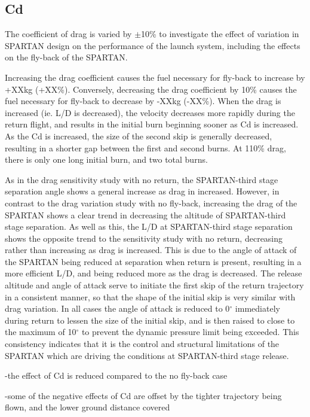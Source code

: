 \subsection{Cd}

The coefficient of drag is varied by $\pm$10\% to investigate the effect of variation in SPARTAN design on the performance of the launch system, including the effects on the fly-back of the SPARTAN. 

Increasing the drag coefficient causes the fuel necessary for fly-back to increase by +XXkg (+XX\%). Conversely, decreasing the drag coefficient by 10\% causes the fuel necessary for  fly-back to decrease by -XXkg (-XX\%). 
When the drag is increased (ie. L/D is decreased), the velocity decreases more rapidly during the return flight, and results in the initial burn beginning sooner as Cd is increased. 
As the Cd is increased, the size of the second skip is generally decreased, resulting in a shorter gap between the first and second burns. At 110\% drag, there is only one long initial burn, and two total burns. 



As in the drag sensitivity study with no return, the SPARTAN-third stage separation angle shows a general increase as drag in increased. However, in contrast to the drag variation study with no fly-back, increasing the drag of the SPARTAN shows a clear trend in decreasing the altitude of SPARTAN-third stage separation. 
As well as this, the L/D at SPARTAN-third stage separation shows the opposite trend to the sensitivity study with no return, decreasing rather than increasing as drag is increased. This is due to the angle of attack of the SPARTAN being reduced at separation when return is present, resulting in a more efficient L/D, and being reduced more as the drag is decreased. 
The release altitude and angle of attack serve to initiate the first skip of the return trajectory in a consistent manner, so that the shape of the initial skip is very similar with drag variation. In all cases the angle of attack is reduced to 0$^\circ$ immediately during return to lessen the size of the initial skip, and is then raised to close to the maximum of 10$^\circ$ to prevent the dynamic pressure limit being exceeded. This consistency indicates that it is the control and structural limitations of the SPARTAN which are driving the conditions at SPARTAN-third stage release. 


-the effect of Cd is reduced compared to the no fly-back case

-some of the negative effects of Cd are offset by the tighter trajectory being flown, and the lower ground distance covered


